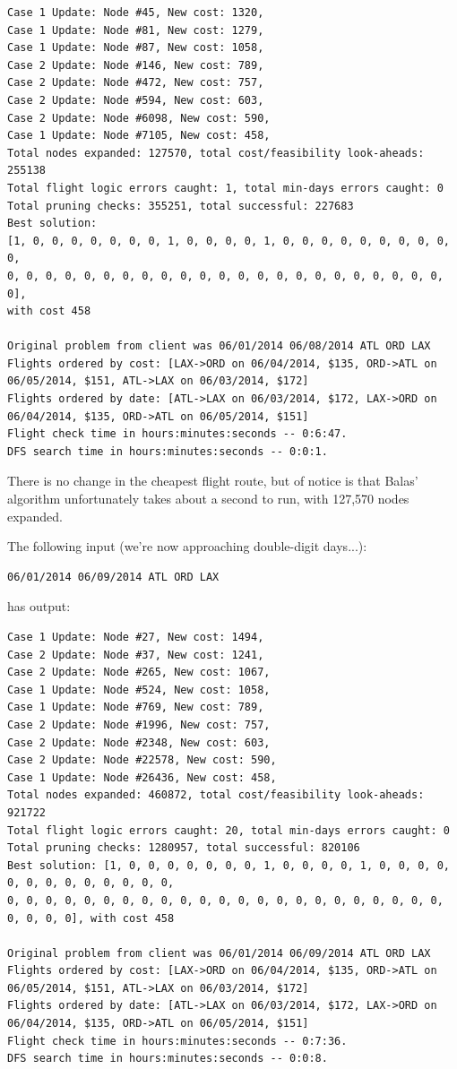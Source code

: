 \documentclass{article}
\begin{document}
\scriptsize
\begin{verbatim}
Case 1 Update: Node #45, New cost: 1320, 
Case 1 Update: Node #81, New cost: 1279, 
Case 1 Update: Node #87, New cost: 1058, 
Case 2 Update: Node #146, New cost: 789, 
Case 2 Update: Node #472, New cost: 757, 
Case 2 Update: Node #594, New cost: 603, 
Case 2 Update: Node #6098, New cost: 590, 
Case 1 Update: Node #7105, New cost: 458, 
Total nodes expanded: 127570, total cost/feasibility look-aheads: 255138
Total flight logic errors caught: 1, total min-days errors caught: 0
Total pruning checks: 355251, total successful: 227683
Best solution:
[1, 0, 0, 0, 0, 0, 0, 0, 1, 0, 0, 0, 0, 1, 0, 0, 0, 0, 0, 0, 0, 0, 0, 0,
0, 0, 0, 0, 0, 0, 0, 0, 0, 0, 0, 0, 0, 0, 0, 0, 0, 0, 0, 0, 0, 0, 0, 0],
with cost 458

Original problem from client was 06/01/2014 06/08/2014 ATL ORD LAX
Flights ordered by cost: [LAX->ORD on 06/04/2014, $135, ORD->ATL on 06/05/2014, $151, ATL->LAX on 06/03/2014, $172]
Flights ordered by date: [ATL->LAX on 06/03/2014, $172, LAX->ORD on 06/04/2014, $135, ORD->ATL on 06/05/2014, $151]
Flight check time in hours:minutes:seconds -- 0:6:47.
DFS search time in hours:minutes:seconds -- 0:0:1.
\end{verbatim}
\normalsize

There is no change in the cheapest flight route, but of notice is that Balas' algorithm unfortunately takes about a second to run, with 127,570 nodes
expanded.

The following input (we're now approaching double-digit days...):

\begin{verbatim}
06/01/2014 06/09/2014 ATL ORD LAX
\end{verbatim}

has output:

\scriptsize
\begin{verbatim}
Case 1 Update: Node #27, New cost: 1494, 
Case 2 Update: Node #37, New cost: 1241, 
Case 2 Update: Node #265, New cost: 1067, 
Case 1 Update: Node #524, New cost: 1058, 
Case 1 Update: Node #769, New cost: 789, 
Case 2 Update: Node #1996, New cost: 757, 
Case 2 Update: Node #2348, New cost: 603, 
Case 2 Update: Node #22578, New cost: 590, 
Case 1 Update: Node #26436, New cost: 458, 
Total nodes expanded: 460872, total cost/feasibility look-aheads: 921722
Total flight logic errors caught: 20, total min-days errors caught: 0
Total pruning checks: 1280957, total successful: 820106
Best solution: [1, 0, 0, 0, 0, 0, 0, 0, 1, 0, 0, 0, 0, 1, 0, 0, 0, 0, 0, 0, 0, 0, 0, 0, 0, 0, 0,
0, 0, 0, 0, 0, 0, 0, 0, 0, 0, 0, 0, 0, 0, 0, 0, 0, 0, 0, 0, 0, 0, 0, 0, 0, 0, 0], with cost 458

Original problem from client was 06/01/2014 06/09/2014 ATL ORD LAX
Flights ordered by cost: [LAX->ORD on 06/04/2014, $135, ORD->ATL on 06/05/2014, $151, ATL->LAX on 06/03/2014, $172]
Flights ordered by date: [ATL->LAX on 06/03/2014, $172, LAX->ORD on 06/04/2014, $135, ORD->ATL on 06/05/2014, $151]
Flight check time in hours:minutes:seconds -- 0:7:36.
DFS search time in hours:minutes:seconds -- 0:0:8.
\end{verbatim}
\normalsize
\end{document}
